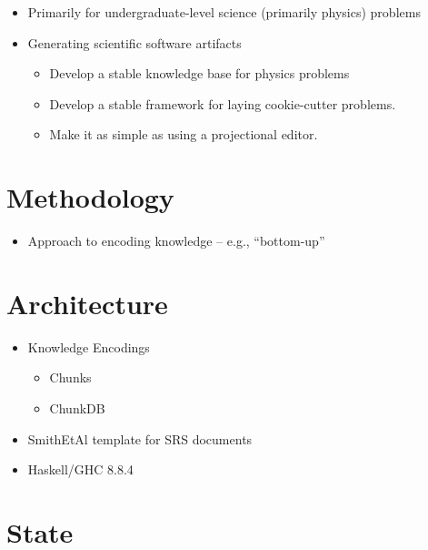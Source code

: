 \begin{itemize}
    \item Primarily for undergraduate-level science (primarily physics) problems
    \item Generating scientific software artifacts
          \begin{itemize}
              \item Develop a stable knowledge base for physics problems
              \item Develop a stable framework for laying cookie-cutter
                    problems.
              \item Make it as simple as using a projectional editor.
          \end{itemize}
\end{itemize}

\section{Methodology}

\begin{itemize}
    \item Approach to encoding knowledge -- e.g., ``bottom-up''
\end{itemize}

\section{Architecture}

\begin{itemize}

    \item Knowledge Encodings
          \begin{itemize}
              \item Chunks
              \item ChunkDB
          \end{itemize}

    \item SmithEtAl template for SRS documents

    \item Haskell/GHC 8.8.4

\end{itemize}

\section{State}


